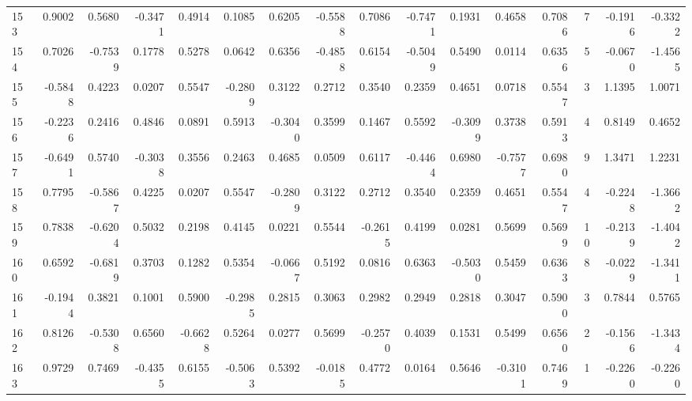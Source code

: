 \begin{tabular}{lrrrrrrrrrrrrrrr}
153 &      0.9002 &  0.5680 & -0.3471 &  0.4914 &  0.1085 &  0.6205 & -0.5588 &  0.7086 & -0.7471 &  0.1931 &   0.4658 &     0.7086 &      7 &                   -0.1916 &                    -0.3322 \\
154 &      0.7026 & -0.7539 &  0.1778 &  0.5278 &  0.0642 &  0.6356 & -0.4858 &  0.6154 & -0.5049 &  0.5490 &   0.0114 &     0.6356 &      5 &                   -0.0670 &                    -1.4565 \\
155 &     -0.5848 &  0.4223 &  0.0207 &  0.5547 & -0.2809 &  0.3122 &  0.2712 &  0.3540 &  0.2359 &  0.4651 &   0.0718 &     0.5547 &      3 &                    1.1395 &                     1.0071 \\
156 &     -0.2236 &  0.2416 &  0.4846 &  0.0891 &  0.5913 & -0.3040 &  0.3599 &  0.1467 &  0.5592 & -0.3099 &   0.3738 &     0.5913 &      4 &                    0.8149 &                     0.4652 \\
157 &     -0.6491 &  0.5740 & -0.3038 &  0.3556 &  0.2463 &  0.4685 &  0.0509 &  0.6117 & -0.4464 &  0.6980 &  -0.7577 &     0.6980 &      9 &                    1.3471 &                     1.2231 \\
158 &      0.7795 & -0.5867 &  0.4225 &  0.0207 &  0.5547 & -0.2809 &  0.3122 &  0.2712 &  0.3540 &  0.2359 &   0.4651 &     0.5547 &      4 &                   -0.2248 &                    -1.3662 \\
159 &      0.7838 & -0.6204 &  0.5032 &  0.2198 &  0.4145 &  0.0221 &  0.5544 & -0.2615 &  0.4199 &  0.0281 &   0.5699 &     0.5699 &     10 &                   -0.2139 &                    -1.4042 \\
160 &      0.6592 & -0.6819 &  0.3703 &  0.1282 &  0.5354 & -0.0667 &  0.5192 &  0.0816 &  0.6363 & -0.5030 &   0.5459 &     0.6363 &      8 &                   -0.0229 &                    -1.3411 \\
161 &     -0.1944 &  0.3821 &  0.1001 &  0.5900 & -0.2985 &  0.2815 &  0.3063 &  0.2982 &  0.2949 &  0.2818 &   0.3047 &     0.5900 &      3 &                    0.7844 &                     0.5765 \\
162 &      0.8126 & -0.5308 &  0.6560 & -0.6628 &  0.5264 &  0.0277 &  0.5699 & -0.2570 &  0.4039 &  0.1531 &   0.5499 &     0.6560 &      2 &                   -0.1566 &                    -1.3434 \\
163 &      0.9729 &  0.7469 & -0.4355 &  0.6155 & -0.5063 &  0.5392 & -0.0185 &  0.4772 &  0.0164 &  0.5646 &  -0.3101 &     0.7469 &      1 &                   -0.2260 &                    -0.2260 \\

\end{tabular}
